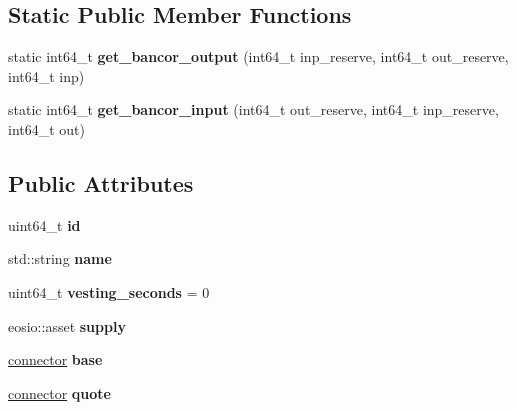 \subsection*{Static Public Member Functions}
\begin{DoxyCompactItemize}
\item 
\mbox{\label{structmarket_a57e03026f8a9da98b890121865ce38c2}} 
static int64\+\_\+t {\bfseries get\+\_\+bancor\+\_\+output} (int64\+\_\+t inp\+\_\+reserve, int64\+\_\+t out\+\_\+reserve, int64\+\_\+t inp)
\item 
\mbox{\label{structmarket_a531f0fd74c1d598da86ac45c50c9f800}} 
static int64\+\_\+t {\bfseries get\+\_\+bancor\+\_\+input} (int64\+\_\+t out\+\_\+reserve, int64\+\_\+t inp\+\_\+reserve, int64\+\_\+t out)
\end{DoxyCompactItemize}
\subsection*{Public Attributes}
\begin{DoxyCompactItemize}
\item 
\mbox{\label{structmarket_ae532d3fe0cf32f7ce146ac8dc471193d}} 
uint64\+\_\+t {\bfseries id}
\item 
\mbox{\label{structmarket_a193ab300909085d98571159a2ac0f525}} 
std\+::string {\bfseries name}
\item 
\mbox{\label{structmarket_a14276e13986dd8f9467e4f46cbe36f74}} 
uint64\+\_\+t {\bfseries vesting\+\_\+seconds} = 0
\item 
\mbox{\label{structmarket_a43fd06e1fccaf87a936e0cbf98e4d6a6}} 
eosio\+::asset {\bfseries supply}
\item 
\mbox{\label{structmarket_a2c729f8f225ad991298224c1b5b8afee}} 
\mbox{\hyperlink{structmarket_1_1connector}{connector}} {\bfseries base}
\item 
\mbox{\label{structmarket_a7328f8895180f466a1354c2e3110a54b}} 
\mbox{\hyperlink{structmarket_1_1connector}{connector}} {\bfseries quote}
\end{DoxyCompactItemize}


